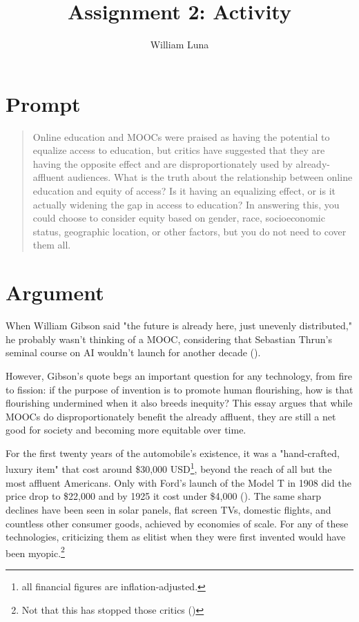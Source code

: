 \documentclass[
	letterpaper, %
]{jdf}
\author{William Luna}
\title{Assignment 2: Activity}
\begin{document}
\newcommand{\pcite}[1]{(\cite{#1})}

\maketitle

\section{Prompt} 

\blockquote{Online education and MOOCs were praised as having the potential to equalize access to education, but critics have suggested that they are having the opposite effect and are disproportionately used by already-affluent audiences. What is the truth about the relationship between online education and equity of access? Is it having an equalizing effect, or is it actually widening the gap in access to education? In answering this, you could choose to consider equity based on gender, race, socioeconomic status, geographic location, or other factors, but you do not need to cover them all.}

\section{Argument}

When William Gibson said "the future is already here, just unevenly distributed," he probably wasn't thinking of a MOOC, considering that Sebastian Thrun's seminal course on AI wouldn't launch for another decade \pcite{gibson, Thrun2012}.

However, Gibson's quote begs an important question for any technology, from fire to fission: if the purpose of invention is to promote human flourishing, how is that flourishing undermined when it also breeds inequity? This essay argues that while MOOCs do disproportionately benefit the already affluent, they are still a net good for society and becoming more equitable over time.

For the first twenty years of the automobile's existence, it was a "hand-crafted, luxury item" that cost around \$30,000 USD\footnote{all financial figures are inflation-adjusted.}, beyond the reach of all but the most affluent Americans. Only with Ford's launch of the Model T in 1908 did the price drop to \$22,000 and by 1925 it cost under \$4,000 \pcite{ford}. The same sharp declines have been seen in solar panels, flat screen TVs, domestic flights, and countless other consumer goods, achieved by economies of scale. For any of these technologies, criticizing them as elitist when they were first invented would have been myopic.\footnote{Not that this has stopped those critics \pcite{StanfordSolarPanels2022}}
\end{document}
